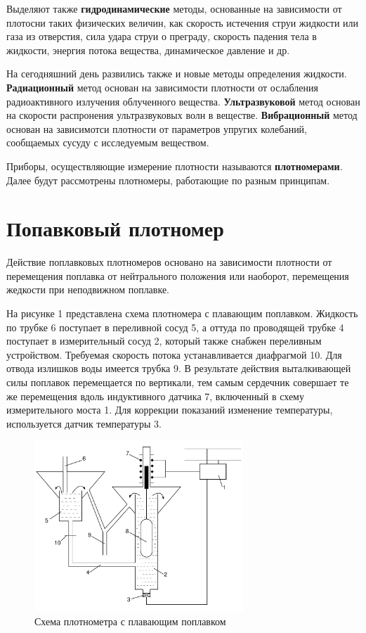 \documentclass[russian, utf8]{eskdtext}
\begin{document}
Выделяют также \textbf{гидродинамические} методы, основанные на зависимости от плотосни таких физических величин, как скорость истечения струи жидкости или газа из отверстия, сила удара струи о преграду, скорость падения тела в жидкости, энергия потока вещества, динамическое давление и др. \par

На сегодняшний день развились также и новые методы определения жидкости. \textbf{Радиационный} метод основан на зависимости плотности от ослабления радиоактивного излучения облученного вещества. \textbf{Ультразвуковой} метод основан на скорости распронения ультразвуковых волн в веществе. \textbf{Вибрационный} метод основан на зависимотси плотности от параметров упругих колебаний, сообщаемых сусуду с исследуемым веществом. \par

Приборы, осуществляющие измерение плотности называются \textbf{плотномерами}. Далее будут рассмотрены плотномеры, работающие по разным принципам.

\newpage

\section{Попавковый плотномер}

Действие поплавковых плотномеров основано на зависимости плотности от перемещения поплавка от нейтрального положения или наоборот, перемещения жедкости при неподвижном поплавке. \par

На рисунке 1 представлена схема плотномера с плавающим поплавком. Жидкость по трубке 6 поступает в переливной сосуд 5, а оттуда по проводящей трубке 4 поступает в измерительный сосуд 2, который также снабжен переливным устройством. Требуемая скорость потока устанавливается диафрагмой 10. Для отвода излишков воды имеется трубка 9. В результате действия выталкивающей силы поплавок перемещается по вертикали, тем самым сердечник совершает те же перемещения вдоль индуктивного датчика 7, включенный в схему измерительного моста 1. Для коррекции показаний изменение температуры, используется датчик температуры 3. \par 

\begin{figure}[h!]
	\centering
	\includegraphics[width = 0.7\textwidth] {FloatDensityMeter.pdf}
	\caption{Схема плотнометра с плавающим поплавком}
\end{figure}
\end{document}
